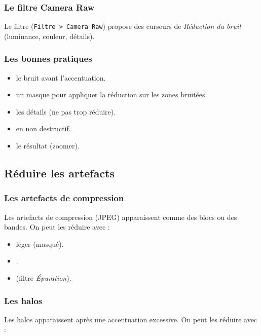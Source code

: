\subsubsection{Le filtre Camera Raw}

Le filtre  (\texttt{Filtre > Camera Raw}) propose des curseurs de \emph{Réduction du bruit} (luminance, couleur, détails).

\subsubsection{Les bonnes pratiques}

\begin{itemize}
    \item {} le bruit avant l'accentuation.
    \item {} un masque pour appliquer la réduction sur les zones bruitées.
    \item {} les détails (ne pas trop réduire).
    \item {} en non destructif.
    \item {} le résultat (zoomer).
\end{itemize}

\subsection{Réduire les artefacts}

\subsubsection{Les artefacts de compression}

Les artefacts de compression (JPEG) apparaissent comme des blocs ou des bandes. On peut les réduire avec :

\begin{itemize}
    \item {} léger (masqué).
    \item {}.
    \item {} (filtre \emph{Épuration}).
\end{itemize}

\subsubsection{Les halos}

Les halos apparaissent après une accentuation excessive. On peut les réduire avec :

